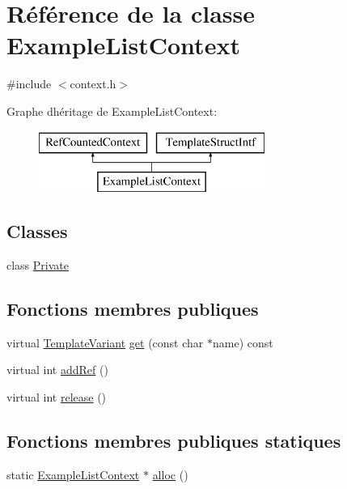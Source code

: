 \hypertarget{class_example_list_context}{}\section{Référence de la classe Example\+List\+Context}
\label{class_example_list_context}


{\ttfamily \#include $<$context.\+h$>$}

Graphe d\textquotesingle{}héritage de Example\+List\+Context\+:\begin{figure}[H]
\begin{center}
\leavevmode
\includegraphics[height=2.000000cm]{class_example_list_context}
\end{center}
\end{figure}
\subsection*{Classes}
\begin{DoxyCompactItemize}
\item 
class \hyperlink{class_example_list_context_1_1_private}{Private}
\end{DoxyCompactItemize}
\subsection*{Fonctions membres publiques}
\begin{DoxyCompactItemize}
\item 
virtual \hyperlink{class_template_variant}{Template\+Variant} \hyperlink{class_example_list_context_a488807f95afc31934f70410654349812}{get} (const char $\ast$name) const 
\item 
virtual int \hyperlink{class_example_list_context_a94636ca4704e815f35339998fba5940b}{add\+Ref} ()
\item 
virtual int \hyperlink{class_example_list_context_a16f04119a9b9f8d728637e149791d708}{release} ()
\end{DoxyCompactItemize}
\subsection*{Fonctions membres publiques statiques}
\begin{DoxyCompactItemize}
\item 
static \hyperlink{class_example_list_context}{Example\+List\+Context} $\ast$ \hyperlink{class_example_list_context_a15672c7c4e0a1ecf0e2c699bf32ab4df}{alloc} ()
\end{DoxyCompactItemize}


